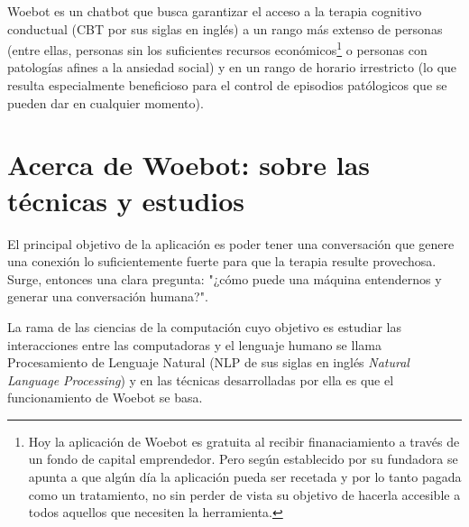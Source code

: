 \documentclass[11pt]{article}
\begin{document}


Woebot es un chatbot que busca garantizar el acceso a la terapia 
cognitivo conductual (CBT por sus siglas en inglés) a 
un rango más extenso de personas (entre ellas, personas 
sin los suficientes recursos económicos\footnotemark[1]\footnote[1]{Hoy la aplicación de Woebot es gratuita 
al recibir finanaciamiento a través de un fondo de 
capital emprendedor. Pero según establecido por su 
fundadora se apunta a que algún día la aplicación 
pueda ser recetada y por lo tanto pagada como un 
tratamiento, no sin perder de vista su objetivo de 
hacerla accesible a todos aquellos que necesiten la 
herramienta.} o personas con 
patologías afines a la ansiedad social) y en un rango 
de horario irrestricto (lo que resulta especialmente 
beneficioso para el control de episodios patólogicos 
que se pueden dar en cualquier momento). 


\section{Acerca de Woebot: sobre las técnicas y estudios}
El principal objetivo de la aplicación es poder tener una conversación que genere una conexión
lo suficientemente fuerte para que la terapia resulte provechosa. Surge, entonces una clara 
pregunta: "¿cómo puede una máquina entendernos y generar una conversación humana?".

La rama de las ciencias de la computación cuyo objetivo es estudiar las interacciones entre las computadoras y el lenguaje humano
se llama Procesamiento de Lenguaje Natural (NLP de sus siglas en inglés 
\textit{Natural Language Processing}) y en las técnicas desarrolladas por ella es que el funcionamiento de Woebot se basa. 
\end{document}
